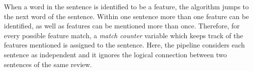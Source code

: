 When a word in the sentence is identified to be a feature, the algorithm jumps to the next word of the sentence. Within one sentence more than one feature can be identified, as well as features can be mentioned more than once. Therefore, for every possible feature match, a\textit{ match counter } variable which keeps track of the features mentioned is assigned to the sentence. Here, the pipeline considers each sentence as independent and it ignores the logical connection between two sentences of the same review.
{}


